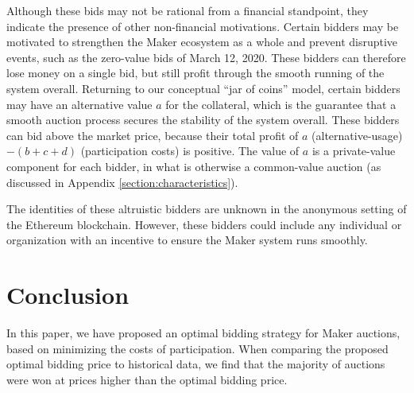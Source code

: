 \documentclass[conference]{IEEEtran}
\begin{document}
Although these bids may not be rational from a financial standpoint, they indicate the presence of other non-financial motivations. Certain bidders may be motivated to strengthen the Maker ecosystem as a whole and prevent disruptive events, such as the zero-value bids of March 12, 2020. These bidders can therefore lose money on a single bid, but still profit through the smooth running of the system overall. Returning to our conceptual ``jar of coins'' model, certain bidders may have an alternative value $a$ for the collateral, which is the guarantee that a smooth auction process secures the stability of the system overall. These bidders can bid above the market price, because their total profit of $a$ (alternative-usage) $-(b+c+d)$ (participation costs) is positive. The value of $a$ is a private-value component for each bidder, in what is otherwise a common-value auction (as discussed in Appendix \ref{section:characteristics}).
    
The identities of these altruistic bidders are unknown in the anonymous setting of the Ethereum blockchain. However, these bidders could include any individual or organization with an incentive to ensure the Maker system runs smoothly.


\section{Conclusion}
\label{sec:conclusion}
In this paper, we have proposed an optimal bidding strategy for Maker auctions, based on minimizing the costs of participation. When comparing the proposed optimal bidding price to historical data, we find that the majority of auctions were won at prices higher than the optimal bidding price. 
\end{document}

